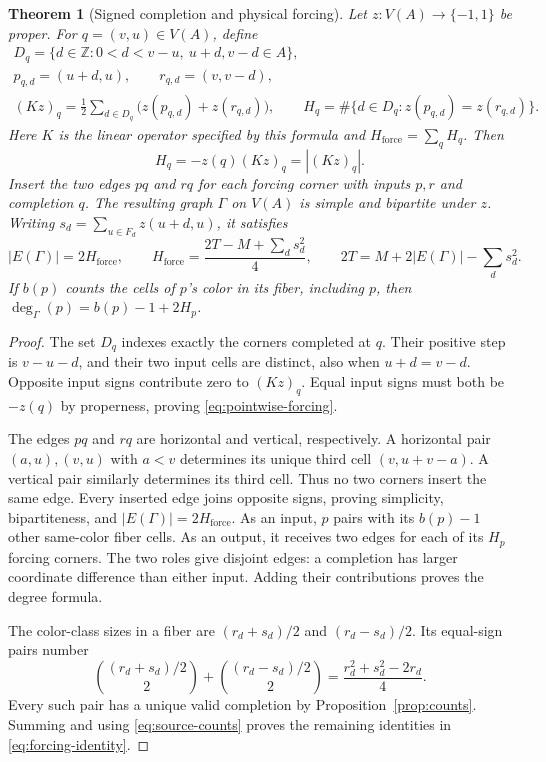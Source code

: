 \documentclass[11pt,a4paper]{article}
\newtheorem{theorem}{Theorem}[section]
\theoremstyle{definition}
\newcommand{\Z}{\mathbb Z}
\newcommand{\force}{H_{\mathrm{force}}}
\numberwithin{equation}{section}
\begin{document}
\begin{samepage}
\begin{theorem}[Signed completion and physical forcing]\label{thm:forcing}
Let $z:V(A)\to\{-1,1\}$ be proper. For $q=(v,u)\in V(A)$, define
\[
\begin{gathered}
D_q=\{d\in\Z:0<d<v-u,\ u+d,v-d\in A\},\\
p_{q,d}=(u+d,u),\qquad r_{q,d}=(v,v-d),\\
(Kz)_q=\frac12\sum_{d\in D_q}\bigl(z(p_{q,d})+z(r_{q,d})\bigr),\qquad
H_q=\#\{d\in D_q:z(p_{q,d})=z(r_{q,d})\}.
\end{gathered}
\]
Here $K$ is the linear operator specified by this formula and
$\force=\sum_qH_q$. Then
\begin{equation}\label{eq:pointwise-forcing}
H_q=-z(q)(Kz)_q=|(Kz)_q|.
\end{equation}
Insert the two edges $pq$ and $rq$ for each forcing corner with
inputs $p,r$ and completion $q$. The resulting graph $\Gamma$ on $V(A)$
is simple and bipartite under $z$. Writing
$s_d=\sum_{u\in F_d}z(u+d,u)$, it satisfies
\begin{equation}\label{eq:forcing-identity}
|E(\Gamma)|=2\force,\qquad
\force=\frac{2T-M+\sum_ds_d^2}{4},\qquad
2T=M+2|E(\Gamma)|-\sum_ds_d^2.
\end{equation}
If $b(p)$ counts the cells of $p$'s color in its fiber, including $p$,
then $\deg_\Gamma(p)=b(p)-1+2H_p$.
\end{theorem}
\end{samepage}
\begin{proof}
The set $D_q$ indexes exactly the corners completed at $q$.
Their positive step is $v-u-d$, and their two input cells are distinct,
also when $u+d=v-d$.
Opposite input signs contribute zero to $(Kz)_q$.
Equal input signs must both be $-z(q)$ by properness, proving
\eqref{eq:pointwise-forcing}.

The edges $pq$ and $rq$ are horizontal and vertical, respectively.
A horizontal pair $(a,u),(v,u)$ with $a<v$ determines its unique
third cell $(v,u+v-a)$. A vertical pair similarly determines its
third cell. Thus no two corners insert the same edge.
Every inserted edge joins opposite signs, proving simplicity,
bipartiteness, and $|E(\Gamma)|=2\force$.
As an input, $p$ pairs with its $b(p)-1$ other same-color fiber cells.
As an output, it receives two edges for each of its $H_p$ forcing
corners. The two roles give disjoint edges: a completion has
larger coordinate difference than either input. Adding their contributions
proves the degree formula.

The color-class sizes in a fiber are $(r_d+s_d)/2$ and $(r_d-s_d)/2$.
Its equal-sign pairs number
\[
\binom{(r_d+s_d)/2}{2}+\binom{(r_d-s_d)/2}{2}
=\frac{r_d^2+s_d^2-2r_d}{4}.
\]
Every such pair has a unique valid completion by Proposition~\ref{prop:counts}.
Summing and using \eqref{eq:source-counts} proves the remaining
identities in \eqref{eq:forcing-identity}.
\end{proof}
\end{document}
